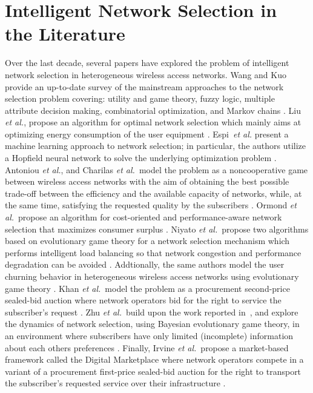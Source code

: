 \section{Intelligent Network Selection in the Literature} %
\label{sec:intelligent_network_selection_in_the_literature_intelligent}
Over the last decade, several papers have explored the problem of intelligent network selection in heterogeneous wireless access networks. Wang and Kuo provide an up-to-date survey of the mainstream approaches to the network selection problem covering: utility and game theory, fuzzy logic, multiple attribute decision making, combinatorial optimization, and Markov chains \cite{LushengKuo2013}. Liu \emph{et al.}, propose an algorithm for optimal network selection which mainly aims at optimizing energy consumption of the user equipment \cite{Liu2009}. Espi~\emph{et al.} present a machine learning approach to network selection; in particular, the authors utilize a Hopfield neural network to solve the underlying optimization problem \cite{Espi10}. Antoniou \emph{et al.}, and Charilas \emph{et al.}~model the problem as a noncooperative game between wireless access networks with the aim of obtaining the best possible trade-off between the efficiency and the available capacity of networks, while, at the same time, satisfying the requested quality by the subscribers \cite{Antoniou07, Charilas08}. Ormond \emph{et al.}~propose an algorithm for cost-oriented and performance-aware network selection that maximizes consumer surplus \cite{OrmondCS106, OrmondCS206}. Niyato \emph{et al.}~propose two algorithms based on evolutionary game theory for a network selection mechanism which performs intelligent load balancing so that network congestion and performance degradation can be avoided \cite{Niyato09}. Addtionally, the same authors model the user churning behavior in heterogeneous wireless access networks using evolutionary game theory \cite{NiyatoHossainConf2008}. Khan \emph{et al.}~model the problem as a procurement second-price sealed-bid auction where network operators bid for the right to service the subscriber's request \cite{Khan110, Khan210}. Zhu \emph{et al.}~build upon the work reported in~\cite{Niyato09}, and explore the dynamics of network selection, using Bayesian evolutionary game theory, in an environment where subscribers have only limited (incomplete) information about each others preferences \cite{ZhuNiyato2010}. Finally, Irvine \emph{et al.}~propose a market-based framework called the Digital Marketplace where network operators compete in a variant of a procurement first-price sealed-bid auction for the right to transport the subscriber's requested service over their infrastructure \cite{DMLeBodic00, DMIrvine01, DMIrvine02}.

